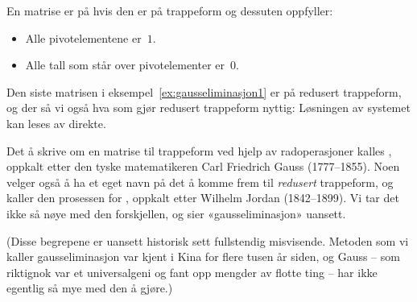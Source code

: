 \begin{defn}
En matrise er på  hvis den er på
trappeform og dessuten oppfyller:
\begin{itemize}
\item Alle pivotelementene er~$1$.
\item Alle tall som står over pivotelementer er~$0$.\qedhere
\end{itemize}
\end{defn}

Den siste matrisen i eksempel~\ref{ex:gausseliminasjon1} er på
redusert trappeform, og der så vi også hva som gjør redusert
trappeform nyttig: Løsningen av systemet kan leses av direkte.

\medskip
Det å  skrive om en matrise til trappeform
ved hjelp av radoperasjoner
kalles , oppkalt etter den tyske
matematikeren Carl Friedrich Gauss (1777--1855).  Noen velger også å
ha et eget navn på det å komme frem til \emph{redusert} trappeform, og
kaller den prosessen for , oppkalt
etter Wilhelm Jordan (1842--1899).  Vi tar det ikke så nøye med den
forskjellen, og sier «gauss\-eliminasjon» uansett.

(Disse begrepene er uansett historisk sett fullstendig misvisende.
Metoden som vi kaller gauss\-eli\-minasjon var kjent i Kina for flere
tusen år siden, og Gauss -- som riktignok var et universalgeni og fant
opp mengder av flotte ting -- har ikke egentlig så mye med den å
gjøre.)


\kapittelslutt
